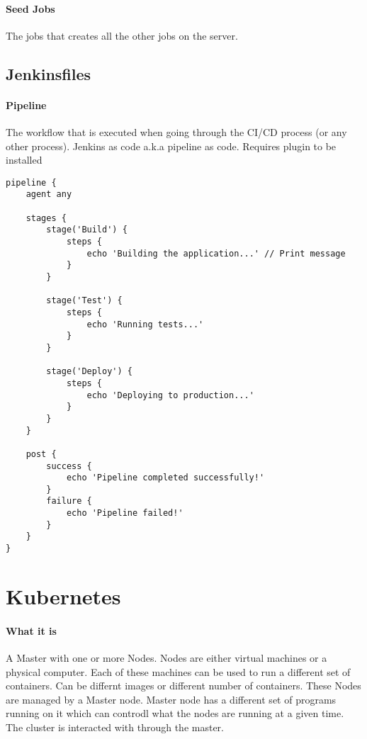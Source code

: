 \documentclass[a4paper, 11pt]{book}
\begin{document}
    \paragraph{Seed Jobs}
    The jobs that creates all the other jobs on the server.

    \subsection{Jenkinsfiles}

    \paragraph{Pipeline}
    The workflow that is executed when going through the CI/CD process (or any other process).
    Jenkins as code a.k.a pipeline as code. Requires plugin to be installed

    \begin{lstlisting}[caption=Jenkinsfile for a CI/CD Pipeline]
pipeline {
    agent any

    stages {
        stage('Build') {
            steps {
                echo 'Building the application...' // Print message
            }
        }

        stage('Test') {
            steps {
                echo 'Running tests...'
            }
        }

        stage('Deploy') {
            steps {
                echo 'Deploying to production...'
            }
        }
    }

    post {
        success {
            echo 'Pipeline completed successfully!'
        }
        failure {
            echo 'Pipeline failed!'
        }
    }
}
    \end{lstlisting}


    \section{Kubernetes}

    \paragraph{What it is}
    A Master with one or more Nodes.
    Nodes are either virtual machines or a physical computer.
    Each of these machines can be used to run a different set of containers.
    Can be differnt images or different number of containers.
    These Nodes are managed by a Master node.
    Master node has a different set of programs running on it which can controdl what the nodes are running at a given time.
    The cluster is interacted with through the master.
\end{document}

